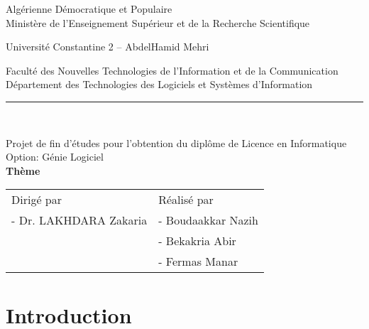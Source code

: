 \documentclass[12pt,french]{report}
\author{Boudaakkar Nazih, Bekakria Abir, Fermas Manar}
\begin{document}
	\begin{titlepage}
		\begin{center}
			\large Algérienne Démocratique et Populaire\\
			
			\large Ministère de l’Enseignement Supérieur et de la Recherche Scientifique
			
			\large Université Constantine 2 – AbdelHamid Mehri\\
			
			\vspace{0.01\textheight}
			
			Faculté des Nouvelles Technologies de l’Information et de la Communication\\
			Département des Technologies des Logiciels et Systèmes d’Information\\
			
			\vspace{0.025\textheight}
			\par\noindent\rule{10cm}{3pt}\\
			\vspace{0.05\textheight}
			
			\large{Projet de fin d’études pour l’obtention du diplôme de Licence en Informatique}\\
			
			\vspace{0.025\textheight}
			Option: Génie Logiciel\\
			
			\vspace{0.025\textheight}			
			\textbf{\large{Thème}}
			
			\vspace{0.025\textheight}			
		\end{center}
	
		\vspace{0.05\textheight}

		\begin{tabular}{l l}
			\LARGE Dirigé par & \LARGE Réalisé par\\
			\multirow{1}{23em}{\Large{- Dr. LAKHDARA Zakaria}} & \Large{- Boudaakkar Nazih}\\
			& \Large{- Bekakria Abir}\\
			& \Large{- Fermas Manar}
		\end{tabular}
	\end{titlepage}
\tableofcontents

\chapter*{Introduction}
\blindtext[3]
\end{document}
